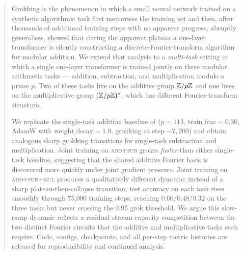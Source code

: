 \begin{abstract}
\noindent
Grokking is the phenomenon in which a small neural network trained on a
synthetic algorithmic task first memorises the training set and then,
after thousands of additional training steps with no apparent progress,
abruptly generalises. \citet{nanda2023progress} showed that during the
apparent plateau a one-layer transformer is silently constructing a
discrete-Fourier-transform algorithm for modular addition. We extend
that analysis to a \emph{multi-task} setting in which a single one-layer
transformer is trained jointly on three modular arithmetic tasks ---
addition, subtraction, and multiplication modulo a prime $p$. Two of
these tasks live on the additive group $\Z/p\Z$ and one lives on the
multiplicative group $(\Z/p\Z)^*$, which has different Fourier-transform
structure.

We replicate the single-task addition baseline of
\citet{nanda2023progress} ($p = 113$, $\mathrm{train\_frac} = 0.30$,
AdamW with $\mathrm{weight\_decay} = 1.0$, grokking at step
$\sim$$7{,}200$) and obtain analogous sharp grokking transitions for
single-task subtraction and multiplication. Joint training on
\textsc{add}+\textsc{sub} grokes \emph{faster} than either single-task
baseline, suggesting that the shared additive Fourier basis is
discovered more quickly under joint gradient pressure. Joint training on
\textsc{add}+\textsc{sub}+\textsc{mul} produces a qualitatively
different dynamic: instead of a sharp plateau-then-collapse transition,
test accuracy on each task rises smoothly through 75{,}000 training
steps, reaching $0.60 / 0.48 / 0.32$ on the three tasks but never
crossing the 0.95 grok threshold. We argue this slow-ramp dynamic
reflects a residual-stream capacity competition between the two
distinct Fourier circuits that the additive and multiplicative tasks
each require. Code, configs, checkpoints, and all per-step metric
histories are released for reproducibility and continued analysis.
\end{abstract}

